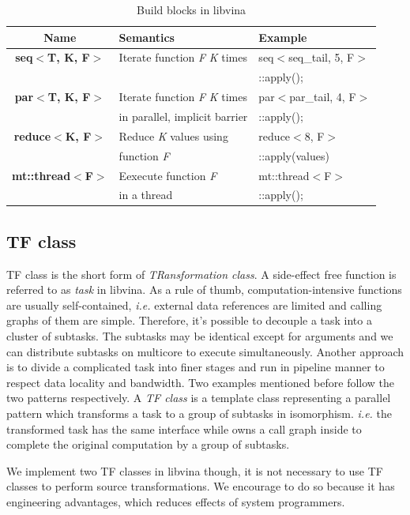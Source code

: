 \begin{table}[hbt]
\caption{Build blocks in libvina}
\begin{tabular}{|c|l|l|}
\hline
Name& Semantics& Example\\
\hline
\textbf{seq$<$T, K, F$>$}& Iterate function \textit{F} \textit{K} times&seq$<$seq\_tail, 5, F$>$\\
&&::apply();\\
\hline
\textbf{par$<$T, K, F$>$}& Iterate function \textit{F} \textit{K} times
&par$<$par\_tail, 4, F$>$\\ 
&in parallel, implicit barrier&::apply();\\                
\hline
\textbf{reduce$<$K, F$>$}&Reduce \textit{K} values using &reduce$<$8, F$>$\\
&function
\textit{F}&::apply(values)\\
\hline
\textbf{mt::thread$<$F$>$}&Eexecute function \textit{F} &mt::thread$<$F$>$\\
&in a thread&::apply();\\
\hline
\end{tabular}\label{tbl:bb}
\end{table}

\subsection{TF class}
TF class is the short form of \textit{TRansformation class}.  A
side-effect free function is referred to as
\emph{task} in libvina. As a rule of thumb,
computation-intensive functions are usually
self-contained, \textit{i.e.} external data references are limited and
calling graphs of them are simple. Therefore, it's possible to
decouple a task into a cluster of subtasks. The subtasks may be identical
except for arguments and we can distribute subtasks on multicore to execute simultaneously.  Another approach is to divide a complicated task into finer stages
and run in pipeline manner to respect data locality and bandwidth. Two
examples mentioned before follow the two patterns respectively. A
\textit{TF class} is a template class representing a parallel pattern which
transforms a task to a group of subtasks in
isomorphism. \textit{i.e.} the transformed task has the same interface
while owns a call graph inside to complete the original computation by a
group of subtasks. 

We implement two TF classes in libvina though,  it is not
necessary to use TF classes to perform source transformations. We
encourage to do so because it has engineering advantages, which reduces
effects of system programmers.

